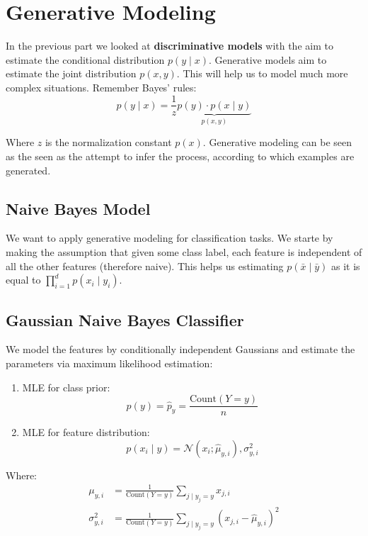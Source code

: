 \section{Generative Modeling}

In the previous part we looked at \textbf{discriminative models} with the aim to estimate the conditional distribution $p(y \; | \; x)$. Generative models aim to estimate the joint distribution $p(x, y)$. This will help us to model much more complex situations. Remember Bayes' rules:
$$p(y \; | \; x) = \frac{1}{z} \underbrace{p(y) \cdot p(x \; | \; y)}_{p(x,y)}$$

Where $z$ is the normalization constant $p(x)$. Generative modeling can be seen as the seen as the attempt to infer the process, according to which examples are generated.

\subsection{Naive Bayes Model}

We want to apply generative modeling for classification tasks. We starte by making the assumption that given some class label, each feature is independent of all the other features (therefore naive). This helps us estimating $p(\bar x \; | \; \bar y)$ as it is equal to $\prod_{i=1}^d p(x_i \; | \; y_i)$. \medskip

\subsection{Gaussian Naive Bayes Classifier}

We model the features by conditionally independent Gaussians and estimate the parameters via maximum likelihood estimation:
\begin{enumerate}
	\item MLE for class prior:
		$$p(y) = \hat p_y = \frac{\text{Count}(Y = y)}{n}$$
	\item MLE for feature distribution:
		$$p(x_i \; | \; y) = \mathcal{N}(x_i; \hat \mu_{y,i}), \sigma^2_{y,i}$$
\end{enumerate}

Where:
\begin{align*}
	\mu_{y,i} &= \frac{1}{\text{Count}(Y = y)} \sum_{j \; | \; y_j = y} x_{j,i}\\
	\sigma^2_{y,i} &= \frac{1}{\text{Count}(Y = y)} \sum_{j \; | \; y_j = y} (x_{j,i} - \hat \mu_{y, i})^2
\end{align*}


